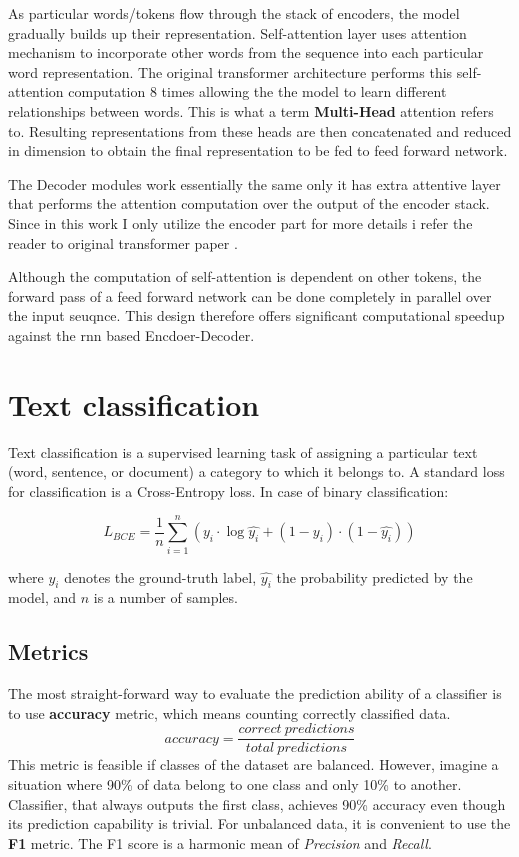 As particular words/tokens flow through the stack of encoders, the model gradually builds up their representation. Self-attention layer uses attention mechanism to incorporate other words from the sequence into each particular word representation. The original transformer architecture performs this self-attention computation 8 times allowing the the model to learn different relationships between words. This is what a term \textbf{Multi-Head} attention refers to. Resulting representations from these heads are then concatenated and reduced in dimension to obtain the final representation to be fed to feed forward network. 

The Decoder modules work essentially the same only it has extra attentive layer that performs the attention computation over the output of the encoder stack. Since in this work I only utilize the encoder part for more details i refer the reader to original transformer paper \cite{vaswani2017attention}.

Although the computation of self-attention is dependent on other tokens, the forward pass of a feed forward network can be done completely in parallel over the input seuqnce. This design therefore offers significant computational speedup against the \gls{rnn} based Encdoer-Decoder.




\section{Text classification}
Text classification is a supervised learning task of assigning a particular text (word, sentence, or document) a category to which it belongs to. A standard loss for classification is a Cross-Entropy loss. In case of binary classification:

\begin{equation}
    L_{BCE} = \frac{1}{n} \sum_{i=1}^n ( y_i \cdot \log\hat{y_i} + (1-y_i)\cdot(1-\hat{y_i}))
\end{equation}

where $y_i$ denotes the ground-truth label, $\hat{y_i}$ the probability predicted by the model, and $n$ is a number of samples.


    
\subsection{Metrics}
The most straight-forward way to evaluate the prediction ability of a classifier is to use \textbf{accuracy} metric, which means counting correctly classified  data. 
\begin{equation}
    accuracy = \frac{correct\ predictions}{total\ predictions}
\end{equation}
This metric is feasible if classes of the dataset are balanced. However, imagine a situation where 90\% of data belong to one class and only 10\% to another. Classifier, that always outputs the first class, achieves 90\% accuracy even though its prediction capability is trivial. For unbalanced data, it is convenient to use the \textbf{F1} metric. The F1 score is a harmonic mean of \textit{Precision} and \textit{Recall}.

